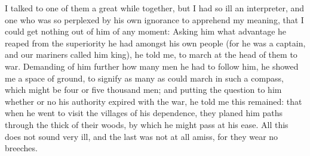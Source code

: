 \documentclass[twocolumn]{article}
\begin{document}
	I talked to one of them a great while together, but I had so ill an interpreter, and one who was so perplexed by his own ignorance to apprehend my meaning, that I could get nothing out of him of any moment: Asking him what advantage he reaped from the superiority he had amongst his own people (for he was a captain, and our mariners called him king), he told me, to march at the head of them to war. Demanding of him further how many men he had to follow him, he showed me a space of ground, to signify as many as could march in such a compass, which might be four or five thousand men; and putting the question to him whether or no his authority expired with the war, he told me this remained: that when he went to visit the villages of his dependence, they planed him paths through the thick of their woods, by which he might pass at his ease. All this does not sound very ill, and the last was not at all amiss, for they wear no breeches.
	
	\endnumbering
\endgroup



\end{document}
